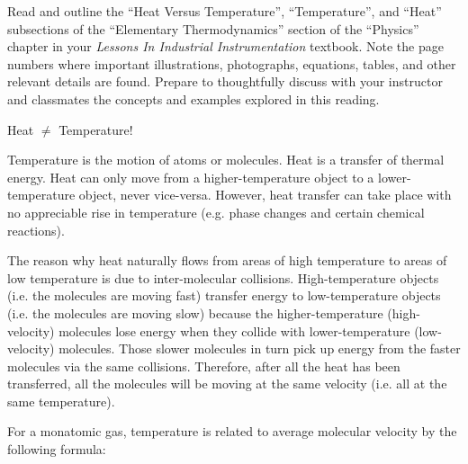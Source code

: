 

Read and outline the ``Heat Versus Temperature'', ``Temperature'', and ``Heat'' subsections of the ``Elementary Thermodynamics'' section of the ``Physics'' chapter in your {\it Lessons In Industrial Instrumentation} textbook.  Note the page numbers where important illustrations, photographs, equations, tables, and other relevant details are found.  Prepare to thoughtfully discuss with your instructor and classmates the concepts and examples explored in this reading.














Heat $\neq$ Temperature!

\vskip 10pt

Temperature is the motion of atoms or molecules.  Heat is a transfer of thermal energy.  Heat can only move from a higher-temperature object to a lower-temperature object, never vice-versa.  However, heat transfer can take place with no appreciable rise in temperature (e.g. phase changes and certain chemical reactions).

\vskip 10pt

The reason why heat naturally flows from areas of high temperature to areas of low temperature is due to inter-molecular collisions.  High-temperature objects (i.e. the molecules are moving fast) transfer energy to low-temperature objects (i.e. the molecules are moving slow) because the higher-temperature (high-velocity) molecules lose energy when they collide with lower-temperature (low-velocity) molecules.  Those slower molecules in turn pick up energy from the faster molecules via the same collisions.  Therefore, after all the heat has been transferred, all the molecules will be moving at the same velocity (i.e. all at the same temperature).

\vskip 10pt

For a monatomic gas, temperature is related to average molecular velocity by the following formula:

